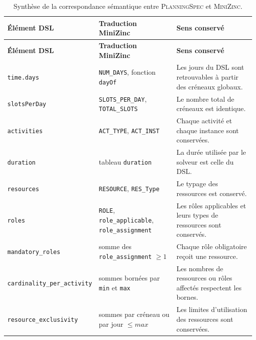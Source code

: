 \documentclass[12pt,a4paper]{article}
\newcommand{\DSL}{\textsc{PlanningSpec}}
\newcommand{\MZN}{\textsc{MiniZinc}}
\newcommand{\codecell}[1]{\texttt{\footnotesize #1}}
\begin{document}
\begingroup
\small
\setlength{\tabcolsep}{4pt}
\renewcommand{\arraystretch}{1.18}
\begin{longtable}{@{}L{0.28\textwidth}L{0.34\textwidth}L{0.30\textwidth}@{}}
\caption{Synthèse de la correspondance sémantique entre \DSL{} et \MZN{}.}
\label{tab:correspondance-dsl-minizinc}\\
\toprule
\textbf{Élément DSL} & \textbf{Traduction MiniZinc} & \textbf{Sens conservé} \\
\midrule
\endfirsthead

\toprule
\textbf{Élément DSL} & \textbf{Traduction MiniZinc} & \textbf{Sens conservé} \\
\midrule
\endhead

\bottomrule
\endlastfoot

\codecell{time.days} &
\codecell{NUM\_DAYS}, fonction \codecell{dayOf} &
Les jours du DSL sont retrouvables à partir des créneaux globaux. \\

\codecell{slotsPerDay} &
\codecell{SLOTS\_PER\_DAY}, \codecell{TOTAL\_SLOTS} &
Le nombre total de créneaux est identique. \\

\codecell{activities} &
\codecell{ACT\_TYPE}, \codecell{ACT\_INST} &
Chaque activité et chaque instance sont conservées. \\

\codecell{duration} &
tableau \codecell{duration} &
La durée utilisée par le solveur est celle du DSL. \\

\codecell{resources} &
\codecell{RESOURCE}, \codecell{RES\_Type} &
Le typage des ressources est conservé. \\

\codecell{roles} &
\codecell{ROLE}, \codecell{role\_applicable}, \codecell{role\_assignment} &
Les rôles applicables et leurs types de ressources sont conservés. \\

\codecell{mandatory\_\allowbreak roles} &
somme des \codecell{role\_assignment} $\geq 1$ &
Chaque rôle obligatoire reçoit une ressource. \\

\codecell{cardinality\_\allowbreak per\_\allowbreak activity} &
sommes bornées par \codecell{min} et \codecell{max} &
Les nombres de ressources ou rôles affectés respectent les bornes. \\

\codecell{resource\_\allowbreak exclusivity} &
sommes par créneau ou par jour $\leq max$ &
Les limites d'utilisation des ressources sont conservées. \\


\end{longtable}
\end{document}
